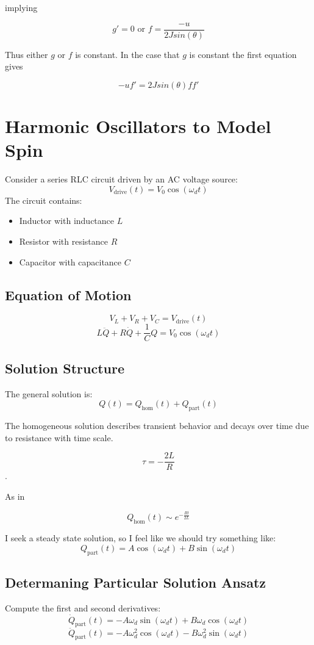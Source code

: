 \documentclass{article}
\begin{document}
implying

\[g' = 0 \text{ or } f = \frac{-u}{2Jsin(\theta)}\]

Thus either $g$ or $f$ is constant. In the case that $g$ is constant the first equation gives

\[-uf' = 2Jsin(\theta)ff'\]

\section{Harmonic Oscillators to Model Spin}

Consider a series RLC circuit driven by an AC voltage source:
\[
V_{\text{drive}}(t) = V_0 \cos(\omega_d t)
\]
The circuit contains:
\begin{itemize}
  \item Inductor with inductance $L$
  \item Resistor with resistance $R$
  \item Capacitor with capacitance $C$
\end{itemize}

\subsection{Equation of Motion}
\[
V_L + V_R + V_C = V_{\text{drive}}(t)
\]
\[
\boxed{L \ddot{Q} + R \dot{Q} + \frac{1}{C} Q = V_0 \cos(\omega_d t)}
\]

\subsection{Solution Structure}

The general solution is:
\[
Q(t) = Q_{\text{hom}}(t) + Q_{\text{part}}(t)
\]

The homogeneous solution describes transient behavior and decays over time due to resistance with time scale.

\[\tau = -\frac{2L}{R}\].

As in 

\[Q_{\text{hom}}(t) \sim e^{-\frac{Rt}{2L}}\]

I seek a steady state solution, so I feel like we should try something like:
\[
Q_{\text{part}}(t) = A \cos(\omega_d t) + B \sin(\omega_d t)
\]

\subsection{Determaning Particular Solution Ansatz}
Compute the first and second derivatives:
\[
\dot{Q}_{\text{part}}(t) = -A \omega_d \sin(\omega_d t) + B \omega_d \cos(\omega_d t)
\]
\[
\ddot{Q}_{\text{part}}(t) = -A \omega_d^2 \cos(\omega_d t) - B \omega_d^2 \sin(\omega_d t)
\]
\end{document}
